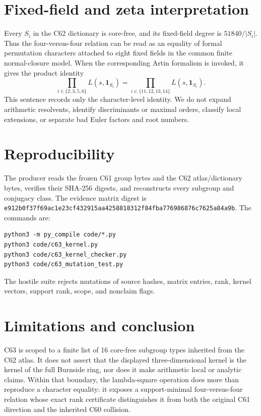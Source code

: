 \documentclass[11pt]{article}
\begin{document}
\section{Fixed-field and zeta interpretation}
Every \(S_i\) in the C62 dictionary is core-free, and its fixed-field degree is
\(51840/|S_i|\).  Thus the four-versus-four relation can be read as an
equality of formal permutation characters attached to eight fixed fields in
the common finite normal-closure model.  When the corresponding Artin
formalism is invoked, it gives the product identity
\[
 \prod_{i\in\{2,3,5,6\}} L(s,\mathbf{1}_{S_i})
 =
 \prod_{i\in\{11,12,13,14\}} L(s,\mathbf{1}_{S_i}).
\]
This sentence records only the character-level identity.  We do not expand
arithmetic resolvents, identify discriminants or maximal orders, classify
local extensions, or separate bad Euler factors and root numbers.

\section{Reproducibility}
The producer reads the frozen C61 group bytes and the C62 atlas/dictionary
bytes, verifies their SHA-256 digests, and reconstructs every subgroup and
conjugacy class.  The evidence matrix digest is
\texttt{e912b0f37f69ac1e23cf432915aa4258818312f84fba776986876c7625a84a9b}.
The commands are:
\begin{verbatim}
python3 -m py_compile code/*.py
python3 code/c63_kernel.py
python3 code/c63_kernel_checker.py
python3 code/c63_mutation_test.py
\end{verbatim}
The hostile suite rejects mutations of source hashes, matrix entries, rank,
kernel vectors, support rank, scope, and nonclaim flags.

\section{Limitations and conclusion}
C63 is scoped to a finite list of 16 core-free subgroup types inherited from
the C62 atlas.  It does not assert that the displayed three-dimensional
kernel is the kernel of the full Burnside ring, nor does it make arithmetic
local or analytic claims.  Within that boundary, the lambda-square operation
does more than reproduce a character equality: it exposes a support-minimal
four-versus-four relation whose exact rank certificate distinguishes it from
both the original C61 direction and the inherited C60 collision.

\appendix
\end{document}

